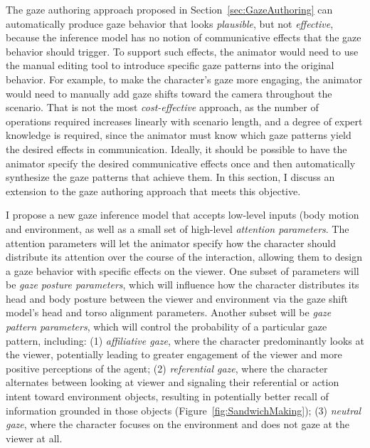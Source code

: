 The gaze authoring approach proposed in Section~\ref{sec:GazeAuthoring} can automatically produce gaze behavior that looks \emph{plausible}, but not \emph{effective}, because the inference model has no notion of communicative effects that the gaze behavior should trigger. To support such effects, the animator would need to use the manual editing tool to introduce specific gaze patterns into the original behavior. For example, to make the character's gaze more engaging, the animator would need to manually add gaze shifts toward the camera throughout the scenario. That is not the most \emph{cost-effective} approach, as the number of operations required increases linearly with scenario length, and a degree of expert knowledge is required, since the animator must know which gaze patterns yield the desired effects in communication. Ideally, it should be possible to have the animator specify the desired communicative effects once and then automatically synthesize the gaze patterns that achieve them. In this section, I discuss an extension to the gaze authoring approach that meets this objective.

I propose a new gaze inference model that accepts low-level inputs (body motion and environment, as well as a small set of high-level \emph{attention parameters}. The attention parameters will let the animator specify how the character should distribute its attention over the course of the interaction, allowing them to design a gaze behavior with specific effects on the viewer. One subset of parameters will be \emph{gaze posture parameters}, which will influence how the character distributes its head and body posture between the viewer and environment via the gaze shift model's head and torso alignment parameters. Another subset will be \emph{gaze pattern parameters}, which will control the probability of a particular gaze pattern, including: (1) \emph{affiliative gaze}, where the character predominantly looks at the viewer, potentially leading to greater engagement of the viewer and more positive perceptions of the agent; (2) \emph{referential gaze}, where the character alternates between looking at viewer and signaling their referential or action intent toward environment objects, resulting in potentially better recall of information grounded in those objects (Figure~\ref{fig:SandwichMaking}); (3) \emph{neutral gaze}, where the character focuses on the environment and does not gaze at the viewer at all.

